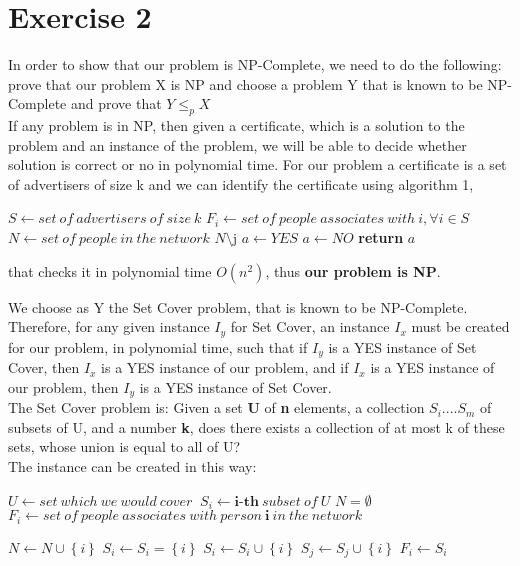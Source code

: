 \documentclass{article}
\begin{document}
\section{Exercise 2}
In order to show that our problem is NP-Complete, we need to do the following: prove that our problem X is NP and choose a problem Y that is known to be NP-Complete and prove that  $ Y \le_{p} X$ \\
If any problem is in NP, then given a certificate, which is a solution to the problem and an instance of the problem, we will be able to decide whether solution is correct or no in polynomial time.
For our problem a certificate is a set of advertisers of size k and we can identify the certificate using algorithm 1,
\begin{algorithm}
\caption{}\label{alg:cap}
\begin{algorithmic}
\State $S \gets set\ of\ advertisers\ of\ size\ k$
\State $F_{i} \gets set\ of\ people\ associates\ with\ i , \forall i\in S$
\State $N \gets set\ of\ people\ in\ the\ network$
$N \setminus $j
\EndFor
\EndFor
{}
\State $a\gets YES$
\Else
\State $a\gets NO$
\EndIf
\State \textbf{return} $a$
\end{algorithmic}
\end{algorithm}
that checks it in polynomial time $O(n^{2})$, thus \textbf{our problem is NP}.

We choose as Y the Set Cover problem, that is known to be NP-Complete. Therefore, for any given instance $I_{y}$  for Set Cover, an instance $I_{x}$ must be created for our problem, in polynomial time, such that if $I_{y}$ is a YES instance of Set Cover, then $I_{x}$ is a YES instance of our problem, and if $I_{x}$ is a YES instance of our problem, then $I_{y}$ is a YES instance of Set Cover.
\\
The Set Cover problem is: Given a set \textbf{U} of \textbf{n} elements, a collection $S_{i}.... S_{m}$ of subsets of U, and a number \textbf{k}, does there exists a collection of at most k of these sets, whose union is equal to all of U?\\
The instance can be created in this way:

\begin{algorithm}
\caption{}\label{alg:cap}
\begin{algorithmic}
\State $U \gets set\ which\ we \ would \ cover\ $
\State $S_{i} \gets \textbf{i-th}\ subset\ of\ U$
\State $N = \emptyset $
\State $F_{i} \gets set\ of\ people\ associates\ with\ person\ \textbf{i} \ in \ the\ network\ $

\State $N \gets N\cup \left \{i  \right \}$
\State $S_{i}	\gets S_{i}=\left \{i  \right \}$
\EndIf
{}
\State $S_{i} \gets S_{i}\cup \left \{i  \right \}$
\EndIf
{}
\State $S_{j} \gets S_{j}\cup \left \{i  \right \}$
\EndFor
\State $F_{i} \gets S_{i}$
\EndFor
\end{algorithmic}
\end{algorithm}
\end{document}
